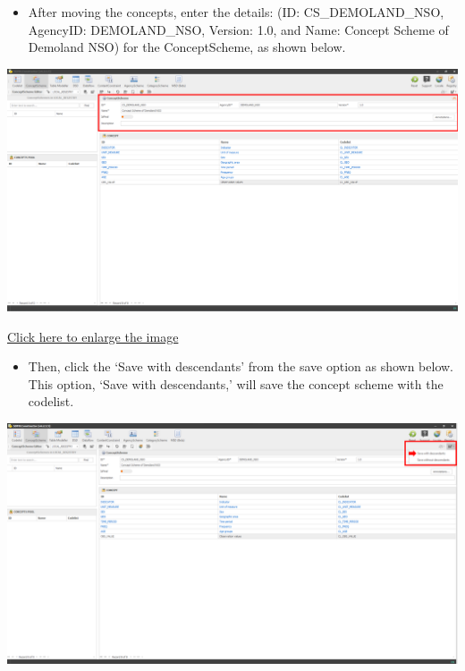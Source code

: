 \documentclass[
]{book}
\providecommand{\tightlist}{%
  \setlength{\itemsep}{0pt}\setlength{\parskip}{0pt}}
\theoremstyle{definition}
\theoremstyle{definition}
\theoremstyle{definition}
\theoremstyle{definition}
\theoremstyle{remark}
\begin{document}
\begin{itemize}
\tightlist
\item
  After moving the concepts, enter the details: (ID: CS\_DEMOLAND\_NSO, AgencyID: DEMOLAND\_NSO, Version: 1.0, and Name: Concept Scheme of Demoland NSO) for the ConceptScheme, as shown below.
\end{itemize}

\begin{center}\includegraphics[width=1\linewidth]{./images/image116} \end{center}

\href{images/image116.png}{Click here to enlarge the image}

\begin{itemize}
\tightlist
\item
  Then, click the `Save with descendants' from the save option as shown below. This option, `Save with descendants,' will save the concept scheme with the codelist.
\end{itemize}

\begin{center}\includegraphics[width=1\linewidth]{./images/image118} \end{center}
\end{document}
